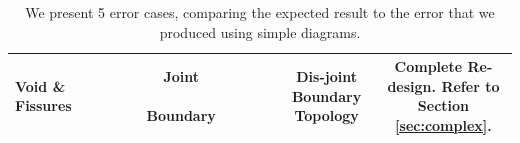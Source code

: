 \begin{table}
\begin{tabularx}{\textwidth}{|m{1.5cm}|C|C|C|}
\centering  Void \& Fissures &  Joint ~~~~~~~~~~~~~~~~~~~~~ Boundary &  Dis-joint Boundary Topology& Complete Re-design. Refer to Section \ref{sec:complex}. \\ \hline

\hline
\end{tabularx}
\caption{We present 5 error cases, comparing the expected result to the error that we produced using simple diagrams.}
\end{table}


